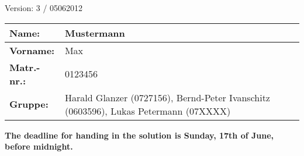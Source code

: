 \documentclass[12pt,a4paper]{uebung}
\begin{document}
\newcommand{\Vorlesung}{Formal Methods in Computer Science}
\newcommand{\Semester}{SS 2012}
\newcommand{\Prof}{Univ.~Prof.~Helmut Veith}
\newcommand{\AssisA}{Dr. Igor Konnov}
\newcommand{\AssisB}{Dr. Florian Zuleger}
\newcommand{\AssisC}{Andreas Holzer, M.Sc.}
\newcommand{\AssisD}{Moritz Sinn, M.Sc.}



\newcommand{\solution}[1]{}

\newcommand\ltlX{\textsf{\textbf{X}}\,}
\newcommand\ltlF{\textsf{\textbf{F}}\,}
\newcommand\ltlG{\textsf{\textbf{G}}\,}
\newcommand\ltlU{\,\textsf{\textbf{U}}\,}
\newcommand\ILTLX[0]{$\mbox{\textsf{ILTL}}_{\mbox{\textsf{-X}}}$}
\newcommand\LTLX[0]{$\mbox{\textsf{LTL}}_{\mbox{\textsf{-X}}}$}




\setlength{\unitlength}{1mm}
{\hfill Version: 3 / 05062012\\}
\begin{tabularx}{\textwidth}{|l|X|}
\hline
\textbf{Name:}& Mustermann \\\hline
\textbf{Vorname:}& Max\\\hline
\textbf{Matr.-nr.:}& 0123456 \\\hline
\textbf{Gruppe:}& Harald Glanzer (0727156), Bernd-Peter Ivanschitz (0603596), Lukas Petermann (07XXXX)  \\\hline
\end{tabularx}



\begin{center}
\textbf{The deadline for handing in the solution is Sunday, 17th of June, before midnight.}
\end{center}


\newpage

\newpage

\newpage

\newpage

\newpage

\newpage

\newpage
%
\end{document}
